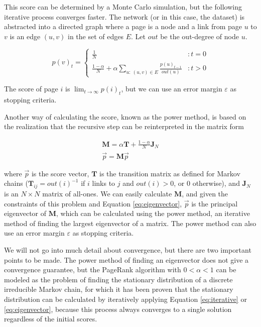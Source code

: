 \documentclass[sigconf, authorversion]{acmart}
\newcommand{\matr}[1]{\textbf{#1}}
\begin{document}
This score can be determined by a Monte Carlo simulation, but the following iterative process converges faster. The network (or in this case, the dataset) is abstracted into a directed graph where a page is a node and a link from page $u$ to $v$ is an edge $(u,v)$ in the set of edges $E$. Let $out$ be the out-degree of node $u$.

\noindent
\begin{equation}
    p(v)_t = \begin{cases}
        \displaystyle\frac{1}{N} &: t=0 \\[8pt]
        \displaystyle\frac{1-\alpha}{N} + \alpha \sum_{u:~(u,v) \in E}{\frac{p(u)_{t-1}}{out(u)}} &: t>0
    \end{cases} \label{eq:iterative}
\end{equation}

\noindent
The score of page $i$ is $\lim_{t \to \infty}{p(i)_t}$, but we can use an error margin $\varepsilon$ as stopping criteria.

Another way of calculating the score, known as the power method, is based on the realization that the recursive step can be reinterpreted in the matrix form

\noindent
\begin{gather}
    \matr{M} = \alpha \matr{T} + \frac{1-\alpha}{N}\matr{J}_N \\[4pt]
    \vec{p} = \matr{M} \vec{p} \label{eq:eigenvector}
\end{gather}

\noindent
where $\vec{p}$ is the score vector, $\matr{T}$ is the transition matrix as defined for Markov chains ($\matr{T}_{ij}={out(i)}^{-1}$ if $i$ links to $j$ and $out(i) > 0$, or $0$ otherwise), and $\matr{J}_N$ is an $N \times N$ matrix of all-ones. We can easily calculate $\matr{M}$, and given the constraints of this problem and Equation \ref{eq:eigenvector}, $\vec{p}$ is the principal eigenvector of $\matr{M}$, which can be calculated using the power method, an iterative method of finding the largest eigenvector of a matrix. The power method can also use an error margin $\varepsilon$ as stopping criteria.

We will not go into much detail about convergence, but there are two important points to be made. The power method of finding an eigenvector does not give a convergence guarantee, but the PageRank algorithm with $0 < \alpha < 1$ can be modeled as the problem of finding the stationary distribution of a discrete irreducible Markov chain, for which it has been proven that the stationary distribution can be calculated by iteratively applying Equation \ref{eq:iterative} or \ref{eq:eigenvector}, because this process always converges to a single solution regardless of the initial scores.
\end{document}
